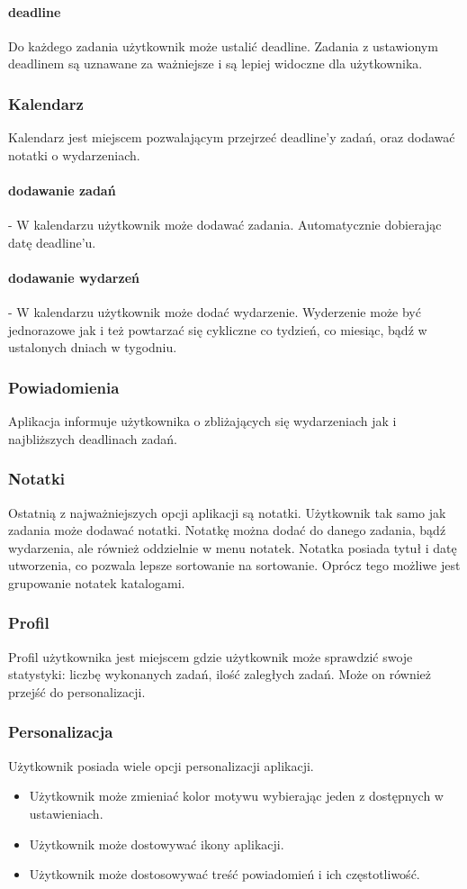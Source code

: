 \documentclass[a4paper,11pt]{article}
\begin{document}
\paragraph{deadline}
Do każdego zadania użytkownik może ustalić deadline. Zadania z ustawionym deadlinem są uznawane za ważniejsze i są lepiej widoczne dla użytkownika.
\subsubsection{Kalendarz}
Kalendarz jest miejscem pozwalającym przejrzeć deadline'y zadań, oraz dodawać notatki o wydarzeniach.
\paragraph{dodawanie zadań} - W kalendarzu użytkownik może dodawać zadania. Automatycznie dobierając datę deadline'u.
\paragraph{dodawanie wydarzeń} - W kalendarzu użytkownik może dodać wydarzenie. Wyderzenie może być jednorazowe jak i też powtarzać się cykliczne co tydzień, co miesiąc, bądź w ustalonych dniach w tygodniu.
\subsubsection{Powiadomienia}
Aplikacja informuje użytkownika o zbliżających się wydarzeniach jak i najbliższych deadlinach zadań.
\subsubsection{Notatki}
Ostatnią z najważniejszych opcji aplikacji są notatki. Użytkownik tak samo jak zadania może dodawać notatki. Notatkę można dodać do danego zadania, bądź wydarzenia, ale również oddzielnie w menu notatek. Notatka posiada tytuł i datę utworzenia, co pozwala lepsze sortowanie na sortowanie. Oprócz tego możliwe jest grupowanie notatek katalogami.
\subsubsection{Profil}
Profil użytkownika jest miejscem gdzie użytkownik może sprawdzić swoje statystyki: liczbę wykonanych zadań, ilość zaległych zadań. Może on również przejść do personalizacji.
\subsubsection{Personalizacja}
Użytkownik posiada wiele opcji personalizacji aplikacji.
\begin{itemize}
\item Użytkownik może zmieniać kolor motywu wybierając jeden z dostępnych w ustawieniach.
\item Użytkownik może dostowywać ikony aplikacji.
\item Użytkownik może dostosowywać treść powiadomień i ich częstotliwość. 
\end{itemize}
\end{document}

